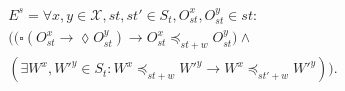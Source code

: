 \documentclass[journal,compsoc]{IEEEtran}
\begin{document}
    \begin{align}\label{eqn:PC}
\begin{split}
E^{s} =  \forall x,y \in \mathcal{X}, \mathit{st},\mathit{st}' \in \mathit{S_t}, O_\mathit{st}^x, O_\mathit{st}^{y} \in \mathit{st}:  \\
\big( \big( \square \left( O_\mathit{st}^x \rightarrow \lozenge O_\mathit{st}^{y} \right) 
 \rightarrow O_\mathit{st}^x \preccurlyeq_{\mathit{st}+w} O_\mathit{st}^{y} \big) \wedge \\
\left( \exists W^x, W'^{y} \in \mathit{S_t}: W^x \preccurlyeq_{\mathit{st}+w} W'^{y} \rightarrow W^x \preccurlyeq_{\mathit{st'}+w} W'^{y} \right) \big).
\end{split}
  \end{align}
\end{document}
